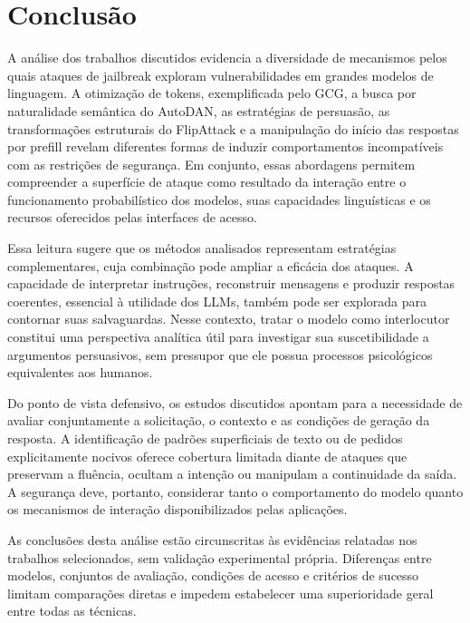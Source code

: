 \section{Conclusão}
\label{chap:conclusao}


A análise dos trabalhos discutidos evidencia a diversidade de mecanismos pelos 
quais ataques de jailbreak exploram vulnerabilidades em grandes modelos de linguagem. 
A otimização de tokens, exemplificada pelo GCG, a busca por naturalidade semântica do 
AutoDAN, as estratégias de persuasão, as transformações estruturais do FlipAttack e a
manipulação do início das respostas por prefill revelam diferentes formas de induzir 
comportamentos incompatíveis com as restrições de segurança. Em conjunto, essas 
abordagens permitem compreender a superfície de ataque como resultado da interação 
entre o funcionamento probabilístico dos modelos, suas capacidades linguísticas e os 
recursos oferecidos pelas interfaces de acesso.

Essa leitura sugere que os métodos analisados representam estratégias complementares, 
cuja combinação pode ampliar a eficácia dos ataques. A capacidade de interpretar 
instruções, reconstruir mensagens e produzir respostas coerentes, essencial à utilidade 
dos LLMs, também pode ser explorada para contornar suas salvaguardas. Nesse contexto, 
tratar o modelo como interlocutor constitui uma perspectiva analítica útil para 
investigar sua suscetibilidade a argumentos persuasivos, sem pressupor que ele 
possua processos psicológicos equivalentes aos humanos.

Do ponto de vista defensivo, os estudos discutidos apontam para a necessidade de 
avaliar conjuntamente a solicitação, o contexto e as condições de geração da resposta. 
A identificação de padrões superficiais de texto ou de pedidos explicitamente nocivos 
oferece cobertura limitada diante de ataques que preservam a fluência, ocultam a 
intenção ou manipulam a continuidade da saída. A segurança deve, portanto, considerar 
tanto o comportamento do modelo quanto os mecanismos de interação disponibilizados pelas 
aplicações.

As conclusões desta análise estão circunscritas às evidências relatadas nos 
trabalhos selecionados, sem validação experimental própria. Diferenças entre modelos, 
conjuntos de avaliação, condições de acesso e critérios de sucesso limitam comparações 
diretas e impedem estabelecer uma superioridade geral entre todas as técnicas.